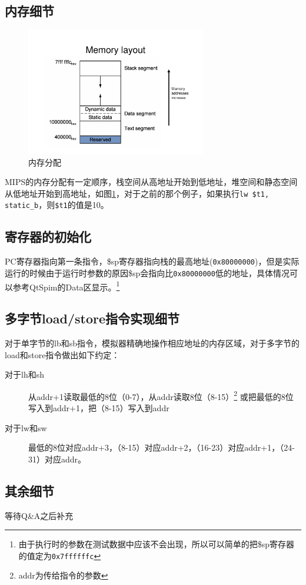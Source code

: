 \documentclass[a4paper, 11pt]{article}
\begin{document}
\subsection{内存细节}
	\begin{figure}[htbp]
		\centering
		\includegraphics[angle=-90, width=0.7\textwidth]{SpimTutorial-page-7}
		\caption{内存分配}
		\label{fig:memory-alloc}
	\end{figure}
	MIPS的内存分配有一定顺序，栈空间从高地址开始到低地址，堆空间和静态空间从低地址开始到高地址，如图\ref{fig:memory-alloc}，对于之前的那个例子，如果执行\texttt{lw \$t1, static\_b}，则\texttt{\$t1}的值是10。
\subsection{寄存器的初始化}
	PC寄存器指向第一条指令，\$sp寄存器指向栈的最高地址(\texttt{0x80000000})，但是实际运行的时候由于运行时参数的原因\$sp会指向比\texttt{0x80000000}低的地址，具体情况可以参考QtSpim的Data区显示。\footnote{由于执行时的参数在测试数据中应该不会出现，所以可以简单的把\$sp寄存器的值定为\texttt{0x7ffffffc}}
\subsection{多字节load/store指令实现细节}
	对于单字节的lb和sb指令，模拟器精确地操作相应地址的内存区域，对于多字节的load和store指令做出如下约定：
	\begin{description}
		\item [对于lh和sh] 从addr+1读取最低的8位（0-7），从addr读取8位（8-15）\footnote{addr为传给指令的参数} 或把最低的8位写入到addr+1，把（8-15）写入到addr
		\item [对于lw和sw] 最低的8位对应addr+3，（8-15）对应addr+2，（16-23）对应addr+1，（24-31）对应addr。
	\end{description}
\subsection{其余细节}
	等待Q\&A之后补充
\end{document}
